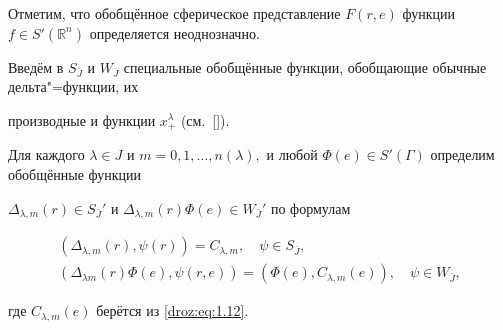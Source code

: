 \smallskip



Отметим, что обобщённое сферическое представление $F(r,e)$ функции $f\in S'(\mathbb R^n)$ определяется неоднозначно.

Введём в $S_{\bar{J}}$ и $W_{\bar{J}}$ специальные обобщённые функции, обобщающие обычные дельта"=функции, их

производные и функции $x_{+}^{\lambda}$ (см.~[]).



\smallskip



\begin{definition}[4]Для каждого $\lambda {\in} J$ и $m{=}0, 1,  \dots, n(\lambda),$ и любой \mbox{$\Phi(e){\in} S'(\Gamma)$} определим обобщённые функции

$\Delta_{\lambda,m}(r)\in S_{\bar{J}}'$ и $\Delta_{\lambda,m}(r) \Phi(e) \in W_{\bar{J}}'$ по формулам

\begin{gather*}

(\Delta_{\lambda,m}(r),\psi(r))=C_{\lambda,m},\quad \psi \in S_{\bar{J}},\\

(\Delta_{\lambda m}(r) \Phi(e),\psi(r,e))=(\Phi(e),C_{\lambda,m}(e)), \quad \psi \in W_{\bar{J}},

\end{gather*}

где $C_{\lambda,m}(e)$ берётся из \eqref{droz:eq:1.12}.

\end{definition}



\smallskip







